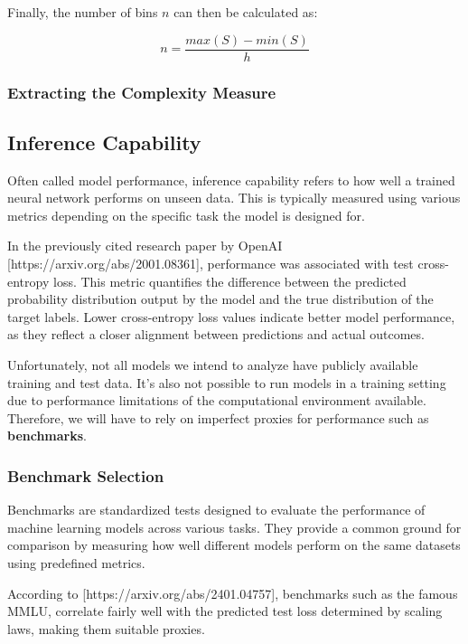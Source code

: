         Finally, the number of bins \( n \) can then be calculated as:

        \[ n = \frac{max(S) - min(S)}{h} \]

    \subsubsection{Extracting the Complexity Measure}

\subsection{Inference Capability}

    Often called model performance, inference capability refers to how well a trained neural network performs on unseen data. This is typically measured using various metrics depending on the specific task the model is designed for. 
    
    In the previously cited research paper by OpenAI [https://arxiv.org/abs/2001.08361], performance was associated with test cross-entropy loss. This metric quantifies the difference between the predicted probability distribution output by the model and the true distribution of the target labels. Lower cross-entropy loss values indicate better model performance, as they reflect a closer alignment between predictions and actual outcomes.

    Unfortunately, not all models we intend to analyze have publicly available training and test data. It's also not possible to run models in a training setting due to performance limitations of the computational environment available. Therefore, we will have to rely on imperfect proxies for performance such as \textbf{benchmarks}.

    \subsubsection{Benchmark Selection}

        Benchmarks are standardized tests designed to evaluate the performance of machine learning models across various tasks. They provide a common ground for comparison by measuring how well different models perform on the same datasets using predefined metrics. 
        
        According to [https://arxiv.org/abs/2401.04757], benchmarks such as the famous MMLU, correlate fairly well with the predicted test loss determined by scaling laws, making them suitable proxies.

